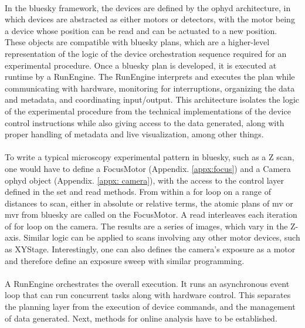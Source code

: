 \paragraph*{} In the bluesky framework, the devices are defined by the ophyd architecture, in which devices are abstracted as either motors or detectors, with the motor being a device whose position can be read and can be actuated to a new position. These objects are compatible with bluesky plans, which are a higher-level representation of the logic of the device orchestration sequence required for an experimental procedure. Once a bluesky plan is developed, it is executed at runtime by a RunEngine. The RunEngine interprets and executes the plan while communicating with hardware, monitoring for interruptions, organizing the data and metadata, and coordinating input/output. This architecture isolates the logic of the experimental procedure from the technical implementations of the device control instructions while also giving access to the data generated, along with proper handling of metadata and live visualization, among other things.

\paragraph*{} To write a typical microscopy experimental pattern in bluesky, such as a Z scan, one would have to define a FocusMotor (Appendix. \ref{appx:focus}) and a Camera ophyd object (Appendix. \ref{appx: camera}), with the access to the control layer defined in the set and read methods. From within a for loop on a range of distances to scan, either in absolute or relative terms, the atomic plans of mv or mvr from bluesky are called on the FocusMotor. A read interleaves each iteration of for loop on the camera. The results are a series of images, which vary in the Z-axis. Similar logic can be applied to scans involving any other motor devices, such as XYStage. Interestingly, one can also defines the camera's exposure as a motor and therefore define an exposure sweep with similar programming.

\paragraph*{} A RunEngine orchestrates the overall execution. It runs an asynchronous event loop that can run concurrent tasks along with hardware control. This separates the planning layer from the execution of device commands, and the management of data generated. Next, methods for online analysis have to be established. 


